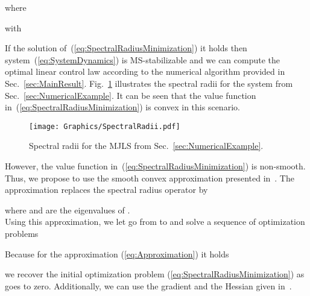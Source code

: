 \documentclass[preprint,1p,11pt]{IR-Template/ISAS_IR}
\begin{document}
where

with

If the solution  of~(\ref{eq:SpectralRadiusMinimization}) it holds  then system~(\ref{eq:SystemDynamics}) is MS-stabilizable and we can compute the optimal linear control law according to the numerical algorithm provided in Sec.~\ref{sec:MainResult}. Fig.~\ref{fig:SpectralRadii} illustrates the spectral radii for the system from Sec.~\ref{sec:NumericalExample}. It can be seen that the value function in~(\ref{eq:SpectralRadiusMinimization}) is convex in this scenario.\\

\begin{figure}
\centering
\texttt{[image: Graphics/SpectralRadii.pdf]}
\caption{Spectral radii for the MJLS from Sec.~\ref{sec:NumericalExample}.}
\label{fig:SpectralRadii}
\end{figure}

However, the value function  in~(\ref{eq:SpectralRadiusMinimization}) is non-smooth. Thus, we propose to use the smooth convex approximation presented in~\cite{Chen_2004}. The approximation replaces the spectral radius operator  by

where  and  are the  eigenvalues of .\\

Using this approximation, we let  go from  to  and solve a sequence of optimization problems

Because for the approximation (\ref{eq:Approximation}) it holds

we recover the initial optimization problem (\ref{eq:SpectralRadiusMinimization}) as  goes to zero. Additionally, we can use the gradient and the Hessian given in~\cite{Chen_2004}.     
    
    
\end{document}
